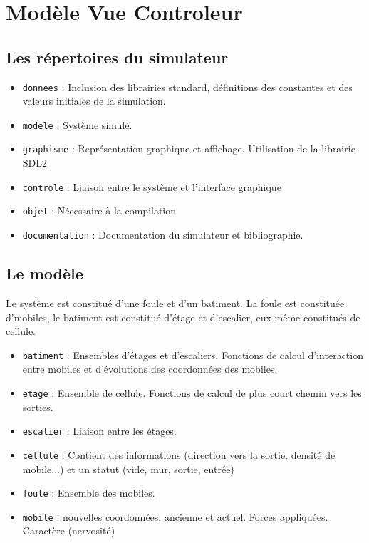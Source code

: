 %
\section{Modèle Vue Controleur}
%
%
\subsection{Les répertoires du simulateur}
\begin{itemize}[leftmargin=2cm]
\item \texttt{donnees} : Inclusion des librairies standard, définitions des constantes et des valeurs initiales de la simulation.
\item \texttt{modele} : Système simulé. 
\item \texttt{graphisme} : Représentation graphique et affichage. Utilisation de la librairie SDL2
\item \texttt{controle} : Liaison entre le système et l'interface graphique 
\item \texttt{objet} : Nécessaire à la compilation
\item \texttt{documentation} : Documentation du simulateur et bibliographie.
\end{itemize}
%
\subsection{Le modèle}
Le système est constitué d'une foule et d'un batiment. La foule est constituée d'mobiles, le batiment est constitué d'étage et d'escalier, eux même constitués de cellule.
\begin{itemize}[leftmargin=2cm]
\item \texttt{batiment} : Ensembles d'étages et d'escaliers. Fonctions de calcul d'interaction entre mobiles et d'évolutions des coordonnées des mobiles.
\item \texttt{etage} : Ensemble de cellule. Fonctions de calcul de plus court chemin vers les sorties.
\item \texttt{escalier} : Liaison entre les étages. 
\item \texttt{cellule} : Contient des informations (direction vers la sortie, densité de mobile...) et un statut (vide, mur, sortie, entrée)
\item \texttt{foule} : Ensemble des mobiles.
\item \texttt{mobile} : nouvelles coordonnées, ancienne et actuel. Forces appliquées. Caractère (nervosité)
\end{itemize}
%
